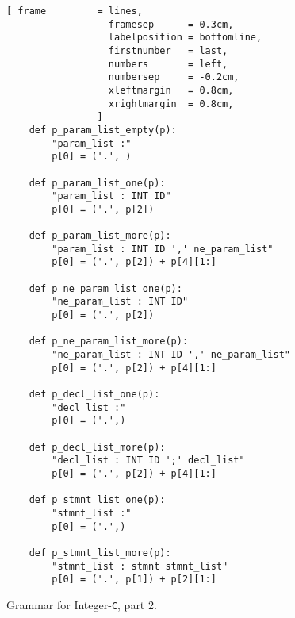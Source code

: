 \begin{figure}[!ht]
\centering
\begin{Verbatim}[ frame         = lines, 
                  framesep      = 0.3cm, 
                  labelposition = bottomline,
                  firstnumber   = last,
                  numbers       = left,
                  numbersep     = -0.2cm,
                  xleftmargin   = 0.8cm,
                  xrightmargin  = 0.8cm,
                ]
    def p_param_list_empty(p):
        "param_list :"
        p[0] = ('.', )
        
    def p_param_list_one(p):
        "param_list : INT ID"
        p[0] = ('.', p[2])
        
    def p_param_list_more(p):
        "param_list : INT ID ',' ne_param_list"
        p[0] = ('.', p[2]) + p[4][1:]
    
    def p_ne_param_list_one(p):
        "ne_param_list : INT ID"
        p[0] = ('.', p[2])
        
    def p_ne_param_list_more(p):
        "ne_param_list : INT ID ',' ne_param_list"
        p[0] = ('.', p[2]) + p[4][1:]
    
    def p_decl_list_one(p):
        "decl_list :"
        p[0] = ('.',)
    
    def p_decl_list_more(p):
        "decl_list : INT ID ';' decl_list"
        p[0] = ('.', p[2]) + p[4][1:]
    
    def p_stmnt_list_one(p):
        "stmnt_list :"
        p[0] = ('.',)
    
    def p_stmnt_list_more(p):
        "stmnt_list : stmnt stmnt_list"
        p[0] = ('.', p[1]) + p[2][1:]
\end{Verbatim}
\vspace*{-0.3cm}
\caption{ Grammar for Integer-\texttt{C}, part 2.}
\label{fig:Compiler.ipynb-2}
\end{figure}

